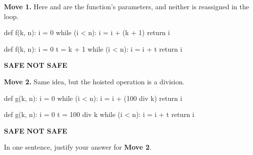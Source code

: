 \documentclass[crop=false]{standalone}
\newif\ifsol
\newcommand{\answerspace}[1]{\ifsol\else\vspace{#1}\par\fi}
\begin{document}
\vspace{6pt}

\textbf{Move 1.} Here  and  are the function's
parameters, and neither is reassigned in the loop.

\begin{minipage}[t]{0.48\textwidth}
\begin{codeblock}[language={}]
  def f(k, n):
    i = 0
    while (i < n):
      i = i + (k + 1)
    return i
\end{codeblock}
\end{minipage}
\hfill
\begin{minipage}[t]{0.48\textwidth}
\begin{codeblock}[language={}]
  def f(k, n):
    i = 0
    t = k + 1
    while (i < n):
      i = i + t
    return i
\end{codeblock}
\end{minipage}

\begin{center}
  \textbf{SAFE} \hspace{4em} \textbf{NOT SAFE}
\end{center}

\answerspace{0.4cm}

\textbf{Move 2.} Same idea, but the hoisted operation is a division.

\begin{minipage}[t]{0.48\textwidth}
\begin{codeblock}[language={}]
  def g(k, n):
    i = 0
    while (i < n):
      i = i + (100 div k)
    return i
\end{codeblock}
\end{minipage}
\hfill
\begin{minipage}[t]{0.48\textwidth}
\begin{codeblock}[language={}]
  def g(k, n):
    i = 0
    t = 100 div k
    while (i < n):
      i = i + t
    return i
\end{codeblock}
\end{minipage}

\begin{center}
  \textbf{SAFE} \hspace{4em} \textbf{NOT SAFE}
\end{center}

\answerspace{0.4cm}

In one sentence, justify your answer for \textbf{Move 2}.

\answerspace{2.8cm}
\end{document}
